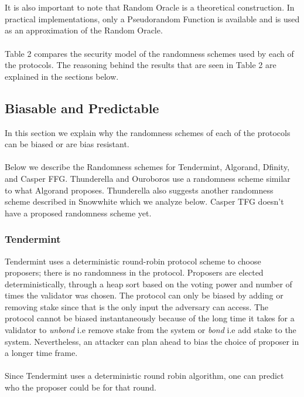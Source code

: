 \documentclass[10pt,journal,compsoc]{IEEEtran}
\begin{document}
\\\\
It is also important to note that Random Oracle is a theoretical construction. In practical implementations, only a Pseudorandom Function is available and is used as an approximation of the Random Oracle. 
\\\\
Table 2 compares the security model of the randomness schemes used by each of the protocols. The reasoning behind the results that are seen in Table 2 are explained in the sections below.

\subsection{Biasable and Predictable}
In this section we explain why the randomness schemes of each of the protocols can be biased or are bias resistant. 
\\\\
Below we describe the Randomness schemes for Tendermint, Algorand, Dfinity, and Casper FFG. Thunderella and Ouroboros use a randomness scheme similar to what Algorand proposes. Thunderella also suggests another randomness scheme described in Snowwhite \cite{SnowWhite} which we analyze below. Casper TFG doesn't have a proposed randomness scheme yet. 
\subsubsection{Tendermint}
Tendermint uses a deterministic round-robin protocol scheme to choose proposers; there is no randomness in the protocol. Proposers are elected deterministically, through a heap sort based on the voting power and number of times the validator was chosen. The protocol can only be biased by adding or removing stake since that is the only input the adversary can access. The protocol cannot be biased instantaneously because of the long time it takes for a validator to \emph{unbond} i.e remove stake from the system or \emph{bond} i.e add stake to the system. Nevertheless, an attacker can plan ahead to bias the choice of proposer in a longer time frame.
\\\\
Since Tendermint uses a deterministic round robin algorithm, one can predict who the proposer could be for that round. 
\end{document}
